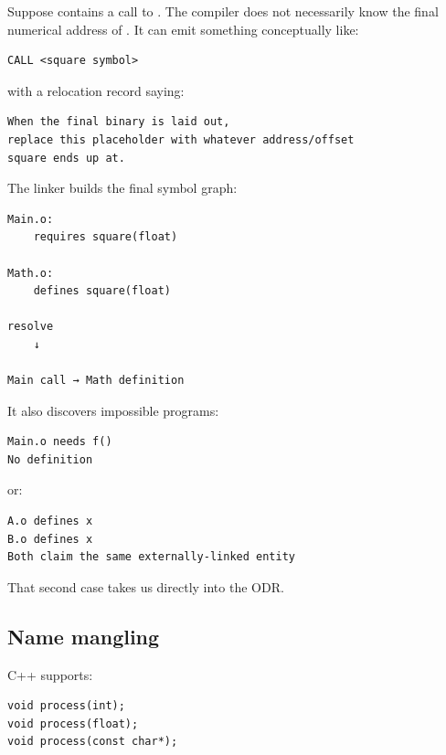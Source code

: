 \hypertarget{01-foundations-i-ch002-what-the-linker-actually-does}{}

Suppose  contains a call to . The compiler does not necessarily know the final numerical address of . It can emit something conceptually like:

\begin{verbatim}
CALL <square symbol>
\end{verbatim}

with a relocation record saying:

\begin{verbatim}
When the final binary is laid out,
replace this placeholder with whatever address/offset
square ends up at.
\end{verbatim}

The linker builds the final symbol graph:

\begin{verbatim}
Main.o:
    requires square(float)

Math.o:
    defines square(float)

resolve
    ↓

Main call → Math definition
\end{verbatim}

It also discovers impossible programs:

\begin{verbatim}
Main.o needs f()
No definition
\end{verbatim}

or:

\begin{verbatim}
A.o defines x
B.o defines x
Both claim the same externally-linked entity
\end{verbatim}

That second case takes us directly into the ODR.

\subsection{Name mangling}\label{01-foundations-i-ch002-name-mangling}

\hypertarget{01-foundations-i-ch002-name-mangling}{}

C++ supports:

\begin{verbatim}
void process(int);
void process(float);
void process(const char*);
\end{verbatim}

